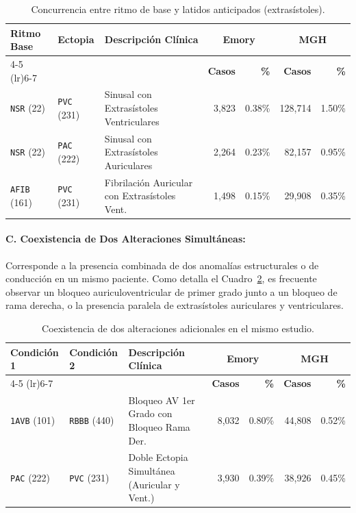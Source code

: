 \documentclass[11pt,a4paper]{article}
\begin{document}
\begin{table}[htbp]
\centering
\small
\renewcommand{\arraystretch}{1.12}
\setlength{\tabcolsep}{5pt}
\begin{tabularx}{\textwidth}{@{} ll X rr rr @{}}
\toprule
\multirow{2}{*}{\textbf{Ritmo Base}} & \multirow{2}{*}{\textbf{Ectopia}} & \multirow{2}{*}{\textbf{Descripción Clínica}} & \multicolumn{2}{c}{\textbf{Emory}} & \multicolumn{2}{c}{\textbf{MGH}} \\
\cmidrule(lr){4-5} \cmidrule(lr){6-7}
& & & \textbf{Casos} & \textbf{\%} & \textbf{Casos} & \textbf{\%} \\
\midrule
\texttt{NSR} (22)  & \texttt{PVC} (231)  & Sinusal con Extrasístoles Ventriculares     &  3,823 & 0.38\% & 128,714 & 1.50\% \\
\texttt{NSR} (22)  & \texttt{PAC} (222)  & Sinusal con Extrasístoles Auriculares       &  2,264 & 0.23\% &  82,157 & 0.95\% \\
\texttt{AFIB} (161)& \texttt{PVC} (231)  & Fibrilación Auricular con Extrasístoles Vent.&  1,498 & 0.15\% &  29,908 & 0.35\% \\
\bottomrule
\end{tabularx}
\caption{Concurrencia entre ritmo de base y latidos anticipados (extrasístoles).}
\label{tab:coocurrencia_ectopias}
\end{table}

\paragraph{C. Coexistencia de Dos Alteraciones Simultáneas:}
Corresponde a la presencia combinada de dos anomalías estructurales o de conducción en un mismo paciente. Como detalla el Cuadro~\ref{tab:coocurrencia_duales}, es frecuente observar un bloqueo auriculoventricular de primer grado junto a un bloqueo de rama derecha, o la presencia paralela de extrasístoles auriculares y ventriculares.

\begin{table}[htbp]
\centering
\small
\renewcommand{\arraystretch}{1.12}
\setlength{\tabcolsep}{5pt}
\begin{tabularx}{\textwidth}{@{} ll X rr rr @{}}
\toprule
\multirow{2}{*}{\textbf{Condición 1}} & \multirow{2}{*}{\textbf{Condición 2}} & \multirow{2}{*}{\textbf{Descripción Clínica}} & \multicolumn{2}{c}{\textbf{Emory}} & \multicolumn{2}{c}{\textbf{MGH}} \\
\cmidrule(lr){4-5} \cmidrule(lr){6-7}
& & & \textbf{Casos} & \textbf{\%} & \textbf{Casos} & \textbf{\%} \\
\midrule
\texttt{1AVB} (101)& \texttt{RBBB} (440) & Bloqueo AV 1er Grado con Bloqueo Rama Der.  &  8,032 & 0.80\% &  44,808 & 0.52\% \\
\texttt{PAC} (222) & \texttt{PVC} (231)  & Doble Ectopia Simultánea (Auricular y Vent.)&  3,930 & 0.39\% &  38,926 & 0.45\% \\
\bottomrule
\end{tabularx}
\caption{Coexistencia de dos alteraciones adicionales en el mismo estudio.}
\label{tab:coocurrencia_duales}
\end{table}
\end{document}
